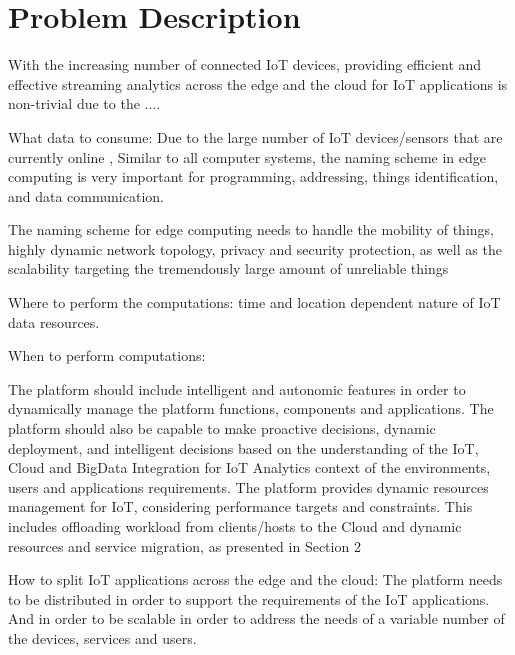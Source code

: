 \section{Problem Description}

With the increasing number of connected IoT devices, providing efficient and effective streaming analytics across the edge and the cloud for IoT applications is non-trivial due to the ....

What data to consume: Due to the large number of IoT devices/sensors that are currently online , Similar to all computer systems, the naming scheme in edge computing is very important for programming, addressing, things identification, and data communication.

The naming scheme for edge computing needs to handle the mobility of things, highly dynamic network topology, privacy and security protection, as well as the scalability targeting the tremendously large amount of unreliable things

Where to perform the computations: time and location dependent nature of IoT data resources.

When to perform computations:

The platform should include intelligent and autonomic features in order to dynamically manage the platform functions, components and applications. The platform should also be capable to make proactive decisions, dynamic deployment, and intelligent decisions based on the understanding of the IoT, Cloud and BigData Integration for IoT Analytics context of the environments, users and applications requirements. The platform provides dynamic resources management for IoT, considering performance targets and constraints. This includes offloading workload from clients/hosts to the Cloud and dynamic resources and service migration, as presented in Section 2


How to split IoT applications across the edge and the cloud: The platform needs to be distributed in order to support the requirements of the IoT applications. And in order to be scalable in order to address the needs of a variable
number of the devices, services and users.


